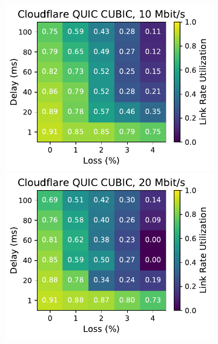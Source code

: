 \begin{figure}[ht]
\begin{subfigure}[b]{0.22\linewidth}
        \includegraphics[width=\linewidth,trim={0 0 2cm 0},clip]{splitting/figures/heatmaps/heatmap_quiche_cubic_10mbps.pdf}
        \includegraphics[width=\linewidth,trim={0 0 2cm 0},clip]{splitting/figures/heatmaps/heatmap_quiche_cubic_20mbps.pdf}

\end{subfigure}
\end{figure}
